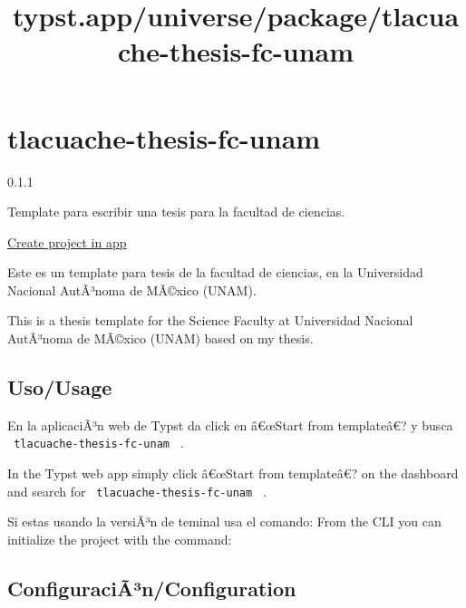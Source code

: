\title{typst.app/universe/package/tlacuache-thesis-fc-unam}

\label{banner}
\label{template-thumbnail}

\section{tlacuache-thesis-fc-unam}\label{tlacuache-thesis-fc-unam}

{ 0.1.1 }

Template para escribir una tesis para la facultad de ciencias.

\href{/app?template=tlacuache-thesis-fc-unam&version=0.1.1}{Create
project in app}

\label{readme}
Este es un template para tesis de la facultad de ciencias, en la
Universidad Nacional AutÃ³noma de MÃ©xico (UNAM).

This is a thesis template for the Science Faculty at Universidad
Nacional AutÃ³noma de MÃ©xico (UNAM) based on my thesis.

\subsection{Uso/Usage}\label{usousage}

En la aplicaciÃ³n web de Typst da click en â€œStart from templateâ€? y
busca \texttt{\ tlacuache-thesis-fc-unam\ } .

In the Typst web app simply click â€œStart from templateâ€? on the
dashboard and search for \texttt{\ tlacuache-thesis-fc-unam\ } .

Si estas usando la versiÃ³n de teminal usa el comando: From the CLI you
can initialize the project with the command:

\begin{Shaded}
\begin{Highlighting}[]
\end{Highlighting}
\end{Shaded}

\subsection{ConfiguraciÃ³n/Configuration}\label{configuraciuxe3uxb3nconfiguration}

